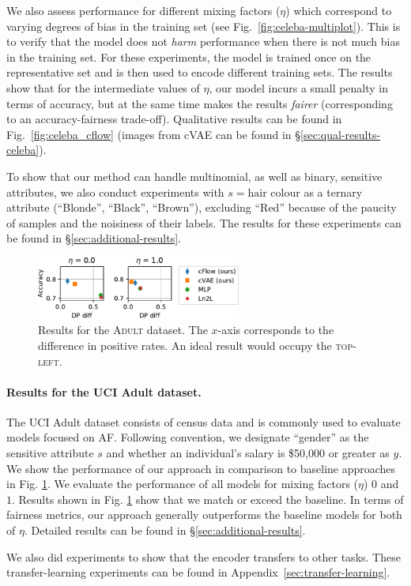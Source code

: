 %
We also assess performance for different mixing factors ($\eta$) which correspond to varying
degrees of bias in the training set (see Fig.~\ref{fig:celeba-multiplot}).
%
This is to verify that the model does not \emph{harm} performance when there is not much bias in
the training set.
%
For these experiments, the model is trained once on the representative set and is then used to
encode different training sets.
%
The results show that for the intermediate values of $\eta$, our model incurs a small penalty in
terms of accuracy, but at the same time makes the results \emph{fairer} (corresponding to an
accuracy-fairness trade-off). 
%
Qualitative results can be found in Fig.~\ref{fig:celeba_cflow} (images from \ac{cVAE} can be found
in \S\ref{sec:qual-results-celeba}).

To show that our method can handle multinomial, as well as binary, sensitive attributes, we also
conduct experiments with $s=\textrm{hair colour}$ as a ternary attribute (``Blonde'', ``Black'',
``Brown''), excluding ``Red'' because of the paucity of samples and the noisiness of their labels.
%
The results for these experiments can be found in \S\ref{sec:additional-results}.

\begin{figure}[tb]
  \centering
  \includegraphics[width=0.6\textwidth]{nifr/Figures/nosinn_adult_multiplot_mini_diff.pdf}
  \caption{
      Results for the \textsc{Adult} dataset.
      The $x$-axis corresponds to the difference in positive rates.
      An ideal result would occupy the \textsc{top-left}.
  }%
  \label{fig:adult-chart}
\end{figure}

\paragraph{Results for the UCI Adult dataset.}
%
The UCI Adult dataset consists of census data and is commonly used to evaluate models focused on
\acl{AF}.
%
Following convention, we designate ``gender'' as the sensitive attribute $s$ and whether an
individual's salary is \$50,000 or greater as $y$.
%
We show the performance of our approach in comparison to baseline approaches in Fig.
\ref{fig:adult-chart}.
%
We evaluate the performance of all models for mixing factors ($\eta$) $0$ and $1$. 
%
Results shown in Fig. \ref{fig:adult-chart} show that we match or exceed the baseline.
%
In terms of fairness metrics, our approach generally outperforms the baseline models for both of
$\eta$.
%
Detailed results can be found in \S\ref{sec:additional-results}.

We also did experiments to show that the encoder transfers to other tasks. 
%
These transfer-learning experiments can be found in Appendix~\ref{sec:transfer-learning}.

